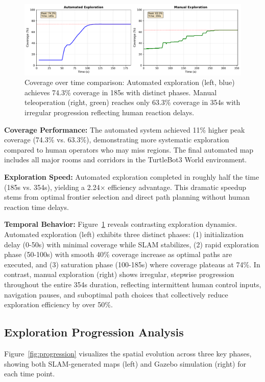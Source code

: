 \documentclass[conference]{IEEEtran}
\begin{document}
\begin{figure}[t]
\centering
\includegraphics[width=\columnwidth]{figures/coverage_comparison.pdf}
\caption{Coverage over time comparison: Automated exploration (left, blue) achieves 74.3\% coverage in 185s with distinct phases. Manual teleoperation (right, green) reaches only 63.3\% coverage in 354s with irregular progression reflecting human reaction delays.}
\label{fig:coverage}
\end{figure}

\textbf{Coverage Performance:} The automated system achieved 11\% higher peak coverage (74.3\% vs. 63.3\%), demonstrating more systematic exploration compared to human operators who may miss regions. The final automated map includes all major rooms and corridors in the TurtleBot3 World environment.

\textbf{Exploration Speed:} Automated exploration completed in roughly half the time (185s vs. 354s), yielding a 2.24$\times$ efficiency advantage. This dramatic speedup stems from optimal frontier selection and direct path planning without human reaction time delays.

\textbf{Temporal Behavior:} Figure~\ref{fig:coverage} reveals contrasting exploration dynamics. Automated exploration (left) exhibits three distinct phases: (1) initialization delay (0-50s) with minimal coverage while SLAM stabilizes, (2) rapid exploration phase (50-100s) with smooth 40\% coverage increase as optimal paths are executed, and (3) saturation phase (100-185s) where coverage plateaus at 74\%. In contrast, manual exploration (right) shows irregular, stepwise progression throughout the entire 354s duration, reflecting intermittent human control inputs, navigation pauses, and suboptimal path choices that collectively reduce exploration efficiency by over 50\%.

\subsection{Exploration Progression Analysis}

Figure~\ref{fig:progression} visualizes the spatial evolution across three key phases, showing both SLAM-generated maps (left) and Gazebo simulation (right) for each time point.
\end{document}
